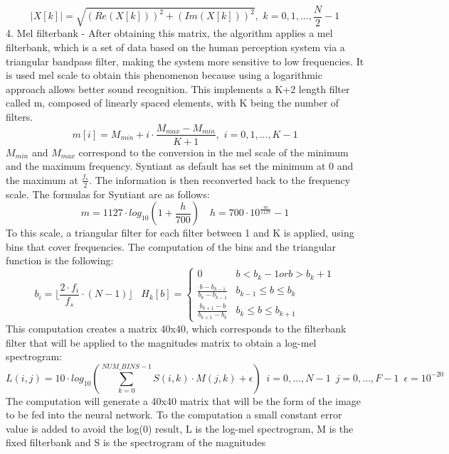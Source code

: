 \begin{equation}
    |X[k]|=\sqrt{(Re(X[k]))^2+(Im(X[k]))^2},\,\,k=0,1,...,\frac{N}{2}-1
\end{equation} 
4. Mel filterbank - After obtaining this matrix, the algorithm applies a mel filterbank, which is a set of data based on the human perception system via a triangular bandpass filter, making the system more sensitive to low frequencies. It is used mel scale to obtain this phenomenon because using a logarithmic approach allows better sound recognition.\newline
This implements a K+2 length filter called m, composed of linearly spaced elements, with K being the number of filters.
\begin{equation}
    m[i]=M_{min}+i\cdot\frac{M_{max}-M_{min}}{K+1},\,\,i=0,1,...,K-1
\end{equation}
$M_{min}$ and $M_{max}$ correspond to the conversion in the mel scale of the minimum and the maximum frequency. Syntiant as default has set the minimum at 0 and the maximum at $\frac{f_s}{2}$. The information is then reconverted back to the frequency scale. The formulas for Syntiant are as follows:
\begin{equation}
    m=1127\cdot log_{10}(1+\frac{h}{700})\,\,\,\,\,\,h=700\cdot 10^{\frac{m}{1127}}-1
\end{equation}
To this scale, a triangular filter for each filter between 1 and K is applied, using bins that cover frequencies. The computation of the bins and the triangular function is the following:
\begin{equation}
    b_i=\lfloor \frac{2\cdot f_i}{f_s}\cdot(N-1)\rfloor\,\,\,\,\,H_k[b]=
    \begin{cases}
        0 & b<b_k-1 or b>b_k+1\\
        \frac{b-b_{k-1}}{b_k-b_{k-1}} & b_{k-1}\leq b \leq b_k\\
        \frac{b_{k+1}-b}{b_{k+1}-b_k} & b_k \leq b \leq b_{k+1}
    \end{cases}
\end{equation}
This computation creates a matrix 40x40, which corresponds to the filterbank filter that will be applied to the magnitudes matrix to obtain a log-mel spectrogram:
\begin{equation}
    L(i,j)=10\cdot log_{10}(\sum_{k=0}^{NUM\_BINS-1}S(i,k)\cdot M(j,k)+\epsilon)\,\,\,i=0,...,N-1\,\,\,j=0,...,F-1\,\,\,\epsilon=10^{-20}
\end{equation}
The computation will generate a 40x40 matrix that will be the form of the image to be fed into the neural network. To the computation a small constant error value is added to avoid the log(0) result, L is the log-mel spectrogram, M is the fixed filterbank and S is the spectrogram of the magnitudes\newline
